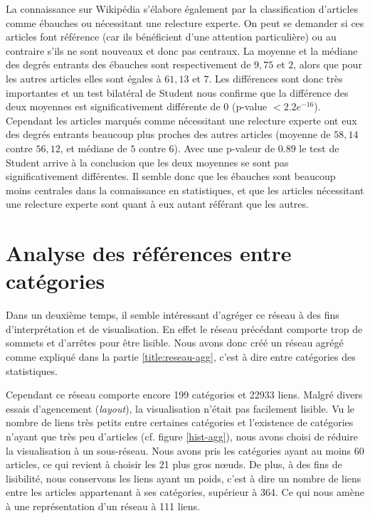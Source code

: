 \documentclass[a4paper]{article}
\begin{document}
La connaissance sur Wikipédia s'élabore également par la classification d'articles comme ébauches ou nécessitant une relecture experte. On peut se demander si ces articles font référence (car ils bénéficient d'une attention particulière) ou au contraire s'ils ne sont nouveaux et donc pas centraux. La moyenne et la médiane des degrés entrants des ébauches sont respectivement de $9,75$ et $2$, alors que pour les autres articles elles sont égales à $61,13$ et $7$. Les différences sont donc très importantes et un test bilatéral de Student nous confirme que la différence des deux moyennes est significativement différente de 0 (p-value $< 2.2e^{-16}$). Cependant les articles marqués comme nécessitant une relecture experte ont eux des degrés entrants beaucoup plus proches des autres articles (moyenne de $58,14$ contre $56,12$, et médiane de $5$ contre $6$). Avec une p-valeur de $0.89$ le test de Student arrive à la conclusion que les deux moyennes se sont pas significativement différentes. Il semble donc que les ébauches sont beaucoup moins centrales dans la connaissance en statistiques, et que les articles nécessitant une relecture experte sont quant à eux autant référant que les autres.


\section{Analyse des références entre catégories} 

Dans un deuxième temps, il semble intéressant d'agréger ce réseau à des fins d'interprétation et de visualisation. En effet le réseau précédant comporte trop de sommets et d’arrêtes pour être lisible. Nous avons donc créé un réseau agrégé comme expliqué dans la partie \ref{title:reseau-agg}, c'est à dire entre catégories des statistiques.

Cependant ce réseau comporte encore 199 catégories et 22933 liens. Malgré divers essais d'agencement (\textit{layout}), la visualisation n'était pas facilement lisible. Vu le nombre de liens très petits entre certaines catégories et l'existence de catégories n'ayant que très peu d'articles (cf. figure \ref{hist-agg}), nous avons choisi de réduire la visualisation à un sous-réseau. Nous avons pris les catégories ayant au moins 60 articles, ce qui revient à choisir les 21 plus gros nœuds. De plus, à des fins de lisibilité, nous conservons les liens ayant un poids, c'est à dire un nombre de liens entre les articles appartenant à ses catégories, supérieur à 364. Ce qui nous amène à une représentation d'un réseau à 111 liens.
\end{document}
